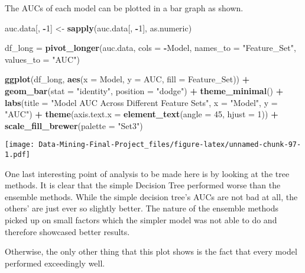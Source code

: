 \documentclass[
]{article}
\newenvironment{Shaded}{\begin{snugshade}}{\end{snugshade}}
\newcommand{\AttributeTok}[1]{\textcolor[rgb]{0.13,0.29,0.53}{#1}}
\newcommand{\DecValTok}[1]{\textcolor[rgb]{0.00,0.00,0.81}{#1}}
\newcommand{\FunctionTok}[1]{\textcolor[rgb]{0.13,0.29,0.53}{\textbf{#1}}}
\newcommand{\NormalTok}[1]{#1}
\newcommand{\OtherTok}[1]{\textcolor[rgb]{0.56,0.35,0.01}{#1}}
\newcommand{\SpecialCharTok}[1]{\textcolor[rgb]{0.81,0.36,0.00}{\textbf{#1}}}
\newcommand{\StringTok}[1]{\textcolor[rgb]{0.31,0.60,0.02}{#1}}
\begin{document}
The AUCs of each model can be plotted in a bar graph as shown.

\begin{Shaded}
\begin{Highlighting}[]
\NormalTok{auc.data[, }\SpecialCharTok{{-}}\DecValTok{1}\NormalTok{] }\OtherTok{\textless{}{-}} \FunctionTok{sapply}\NormalTok{(auc.data[, }\SpecialCharTok{{-}}\DecValTok{1}\NormalTok{], as.numeric)}

\NormalTok{df\_long }\OtherTok{=} \FunctionTok{pivot\_longer}\NormalTok{(auc.data, }\AttributeTok{cols =} \SpecialCharTok{{-}}\NormalTok{Model, }\AttributeTok{names\_to =} \StringTok{"Feature\_Set"}\NormalTok{, }\AttributeTok{values\_to =} \StringTok{"AUC"}\NormalTok{)}

\FunctionTok{ggplot}\NormalTok{(df\_long, }\FunctionTok{aes}\NormalTok{(}\AttributeTok{x =}\NormalTok{ Model, }\AttributeTok{y =}\NormalTok{ AUC, }\AttributeTok{fill =}\NormalTok{ Feature\_Set)) }\SpecialCharTok{+}
  \FunctionTok{geom\_bar}\NormalTok{(}\AttributeTok{stat =} \StringTok{"identity"}\NormalTok{, }\AttributeTok{position =} \StringTok{"dodge"}\NormalTok{) }\SpecialCharTok{+}
  \FunctionTok{theme\_minimal}\NormalTok{() }\SpecialCharTok{+}
  \FunctionTok{labs}\NormalTok{(}\AttributeTok{title =} \StringTok{"Model AUC Across Different Feature Sets"}\NormalTok{,}
       \AttributeTok{x =} \StringTok{"Model"}\NormalTok{,}
       \AttributeTok{y =} \StringTok{"AUC"}\NormalTok{) }\SpecialCharTok{+}
  \FunctionTok{theme}\NormalTok{(}\AttributeTok{axis.text.x =} \FunctionTok{element\_text}\NormalTok{(}\AttributeTok{angle =} \DecValTok{45}\NormalTok{, }\AttributeTok{hjust =} \DecValTok{1}\NormalTok{)) }\SpecialCharTok{+}
  \FunctionTok{scale\_fill\_brewer}\NormalTok{(}\AttributeTok{palette =} \StringTok{"Set3"}\NormalTok{)}
\end{Highlighting}
\end{Shaded}

\texttt{[image: Data-Mining-Final-Project\_files/figure-latex/unnamed-chunk-97-1.pdf]}

One last interesting point of analysis to be made here is by looking at
the tree methods. It is clear that the simple Decision Tree performed
worse than the ensemble methods. While the simple decision tree's AUCs
are not bad at all, the others' are just ever so slightly better. The
nature of the ensemble methods picked up on small factors which the
simpler model was not able to do and therefore showcased better results.

Otherwise, the only other thing that this plot shows is the fact that
every model performed exceedingly well.
\end{document}
